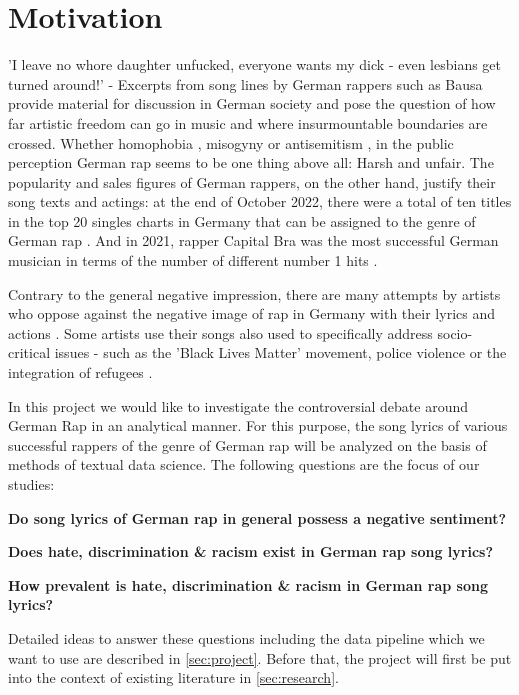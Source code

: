 \section{Motivation}\label{sec:motivation}
'I leave no whore daughter unfucked, everyone wants my dick - even lesbians get turned around!' - Excerpts from song lines by German rappers such as Bausa \cite{steffes-lay_2019} provide material for discussion in German society and pose the question of how far artistic freedom can go in music and where insurmountable boundaries are crossed. Whether homophobia \cite{steffes-lay_2019}, misogyny \cite{steffes-lay_2019} or antisemitism \cite{salomo_greven_2021}, in the public perception German rap seems to be one thing above all: Harsh and unfair. The popularity and sales figures of German rappers, on the other hand, justify their song texts and actings: at the end of October 2022, there were a total of ten titles in the top 20 singles charts in Germany that can be assigned to the genre of German rap \cite{mtv_germany_2022}. And in 2021, rapper Capital Bra was the most successful German musician in terms of the number of different number 1 hits \cite{br_2019}. 

Contrary to the general negative impression, there are many attempts by artists who oppose against the negative image of rap in Germany with their lyrics and actions \cite{Deutschlandfunk_2021}. Some artists use their songs also used to specifically address socio-critical issues - such as the 'Black Lives Matter' movement, police violence or the integration of refugees \cite{me-redaktion_2021}.

In this project we would like to investigate the controversial debate around German Rap in an analytical manner. For this purpose, the song lyrics of various successful rappers of the genre of German rap will be analyzed on the basis of methods of textual data science.  The following questions are the focus of our studies:

\begin{questions}
    \item \textbf{Do song lyrics of German rap in general possess a negative sentiment?}
    \item \textbf{Does hate, discrimination \& racism exist in German rap song lyrics?}
    \item \textbf{How prevalent is hate, discrimination \& racism in German rap song lyrics?}
\end{questions}

Detailed ideas to answer these questions including the data pipeline which we want to use are described in \autoref{sec:project}. Before that, the project will first be put into the context of existing literature in \autoref{sec:research}.










